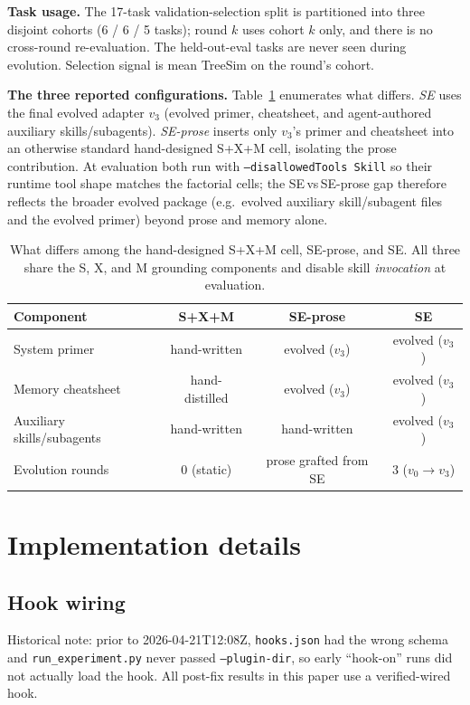 \documentclass{article}
\begin{document}
\textbf{Task usage.} The 17-task validation-selection split is partitioned into three disjoint cohorts (6 / 6 / 5 tasks); round $k$ uses cohort $k$ only, and there is no cross-round re-evaluation. The held-out-eval tasks are never seen during evolution. Selection signal is mean TreeSim on the round's cohort.

\textbf{The three reported configurations.} Table~\ref{tab:se-configs} enumerates what differs. \emph{SE} uses the final evolved adapter $v_3$ (evolved primer, cheatsheet, and agent-authored auxiliary skills/subagents). \emph{SE-prose} inserts only $v_3$'s primer and cheatsheet into an otherwise standard hand-designed S+X+M cell, isolating the prose contribution. At evaluation both run with \texttt{--disallowedTools Skill} so their runtime tool shape matches the factorial cells; the SE\,vs\,SE-prose gap therefore reflects the broader evolved package (e.g.\ evolved auxiliary skill/subagent files and the evolved primer) beyond prose and memory alone.

\begin{table}[h]
  \caption{What differs among the hand-designed S+X+M cell, SE-prose, and SE. All three share the S, X, and M grounding components and disable skill \emph{invocation} at evaluation.}
  \label{tab:se-configs}
  \centering
  \small
  \begin{tabular}{lccc}
    \toprule
    \textbf{Component} & \textbf{S+X+M} & \textbf{SE-prose} & \textbf{SE} \\
    \midrule
    System primer        & hand-written        & evolved ($v_3$)     & evolved ($v_3$) \\
    Memory cheatsheet    & hand-distilled      & evolved ($v_3$)     & evolved ($v_3$) \\
    Auxiliary skills/subagents & hand-written  & hand-written        & evolved ($v_3$) \\
    Evolution rounds     & 0 (static)          & prose grafted from SE & 3 ($v_0\!\to\!v_3$) \\
    \bottomrule
  \end{tabular}
\end{table}

\section{Implementation details}
\label{app:impl}

\subsection{Hook wiring}
Historical note: prior to 2026-04-21T12:08Z, \texttt{hooks.json} had the wrong schema and \texttt{run\_experiment.py} never passed \texttt{--plugin-dir}, so early ``hook-on'' runs did not actually load the hook. All post-fix results in this paper use a verified-wired hook.
\end{document}
